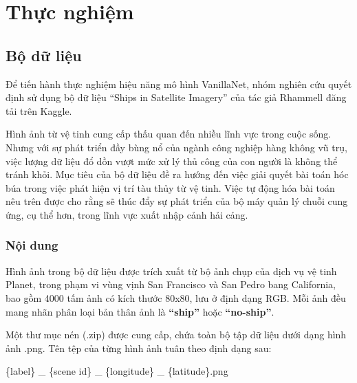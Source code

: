 \documentclass[a4paper,12pt]{article}
\begin{document}
\section{Thực nghiệm}
\subsection{Bộ dữ liệu}
Để tiến hành thực nghiệm hiệu năng mô hình VanillaNet, nhóm nghiên cứu quyết định sử dụng bộ dữ liệu ``Ships in Satellite Imagery'' \cite{robert_hammell_2018} của tác giả Rhammell đăng tải trên Kaggle.

Hình ảnh từ vệ tinh cung cấp thấu quan đến nhiều lĩnh vực trong cuộc sống. Nhưng với sự phát triển đầy bùng nổ của ngành công nghiệp hàng không vũ trụ, việc lượng dữ liệu đổ dồn vượt mức xử lý thủ công của con người là không thể tránh khỏi. Mục tiêu của bộ dữ liệu đề ra hướng đến việc giải quyết bài toán hóc búa trong việc phát hiện vị trí tàu thủy từ vệ tinh. Việc tự động hóa bài toán nêu trên được cho rằng sẽ thúc đẩy sự phát triển của bộ máy quản lý chuỗi cung ứng, cụ thể hơn, trong lĩnh vực xuất nhập cảnh hải cảng.

\subsubsection{Nội dung}
Hình ảnh trong bộ dữ liệu được trích xuất từ bộ ảnh chụp của dịch vụ vệ tinh Planet, trong phạm vi vùng vịnh San Francisco và San Pedro bang California, bao gồm 4000 tấm ảnh có kích thước 80x80, lưu ở định dạng RGB. Mỗi ảnh đều mang nhãn phân loại bản thân ảnh là \textbf{``ship''} hoặc \textbf{``no-ship''}.

Một thư mục nén (.zip) được cung cấp, chứa toàn bộ tập dữ liệu dưới dạng hình ảnh .png. Tên tệp của từng hình ảnh tuân theo định dạng sau: 

\{label\} \_ \{scene id\} \_ \{longitude\} \_ \{latitude\}.png
\end{document}

